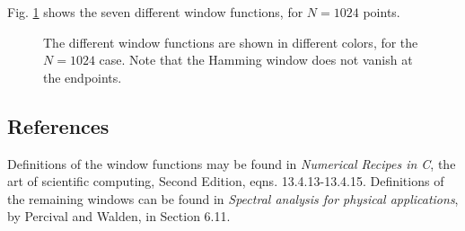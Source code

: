\documentclass{article}
\begin{document}
Fig. \ref{f:window} shows the seven different window functions, for
$N=1024$ points.
\begin{figure}
\hskip -0.5in
\caption{\label{f:window}
The different window functions are shown in different colors, for the
$N=1024$ case. Note that the Hamming window does not vanish at the endpoints.}
\end{figure}

\subsection{References}

Definitions of the window functions may be found in {\it Numerical Recipes in C},
the art of scientific computing, Second Edition, eqns. 13.4.13-13.4.15.  Definitions
of the remaining windows can be found in {\it Spectral analysis for physical applications},
by Percival and Walden, in Section 6.11.
\end{document}
